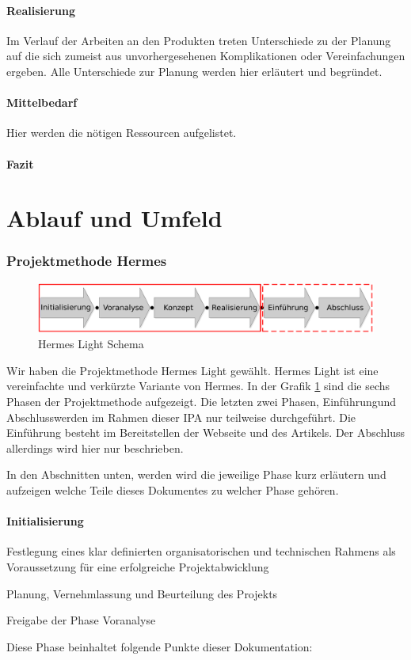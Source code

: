 \documentclass[11pt,paper=a4,final]{scrartcl}
\begin{document}
\subsection{Realisierung}
Im Verlauf der Arbeiten an den Produkten treten Unterschiede zu der Planung auf
die sich zumeist aus unvorhergesehenen Komplikationen oder Vereinfachungen
ergeben. Alle Unterschiede zur Planung werden hier erl\"autert und begr\"undet.
\subsection{Mittelbedarf}
Hier werden die n\"otigen Ressourcen aufgelistet.
\subsection{Fazit}
\part{Ablauf und Umfeld}
\section{Projektmethode Hermes}
\begin{figure}[htb!]
  \centering
  \includegraphics[width=\textwidth]{hermes.pdf}
  \caption{Hermes Light Schema}
  \label{fig:hermes_schema}
\end{figure}
Wir haben die Projektmethode Hermes Light gew\"ahlt. Hermes Light ist eine
vereinfachte und verkürzte Variante von Hermes. In der Grafik
\ref{fig:hermes_schema} sind die sechs Phasen der Projektmethode aufgezeigt. Die
letzten zwei Phasen, \glqq Einführung\grqq und \glqq Abschluss\grqq werden im
Rahmen dieser IPA nur teilweise durchgeführt. Die Einf\"uhrung besteht im
Bereitstellen der Webseite und des Artikels. Der Abschluss allerdings wird hier
nur beschrieben.

In den Abschnitten unten, werden wird die jeweilige Phase kurz erläutern und
aufzeigen welche Teile dieses Dokumentes zu welcher Phase gehören.
\subsection{Initialisierung}
\begin{itemize*}
  \item Festlegung eines klar definierten organisatorischen und technischen
  Rahmens als Voraussetzung für eine erfolgreiche Projektabwicklung
  \item Planung, Vernehmlassung und Beurteilung des Projekts
  \item Freigabe der Phase Voranalyse
\end{itemize*}
Diese Phase beinhaltet folgende Punkte dieser Dokumentation:
\begin{itemize*}
  \item 
\end{itemize*}
\end{document}
